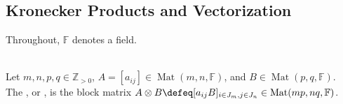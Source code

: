 \subsection{Kronecker Products and Vectorization}

Throughout, $\mathbb{F}$ denotes a field.

\begin{definition} \label{def:kronecker-product} \\
Let $m,n,p,q\in\mathbb{Z}_{>0}$, $A=[a_{ij}]\in\operatorname{Mat}(m,n,\mathbb{F})$, and $B\in\operatorname{Mat}(p,q,\mathbb{F})$.\\
The , or , is the block matrix $A\otimes B\defeq[a_{ij}B]_{i\in J_m,j\in J_n}\in\operatorname{Mat}(mp,nq,\mathbb{F})$.
\end{definition}

